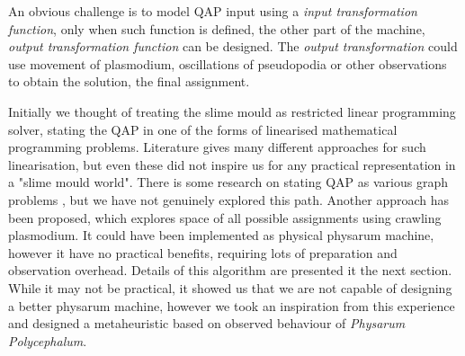 An obvious challenge is to model QAP input using a \textit{input transformation function}, only when such function is defined, the other part of the machine, \textit{output transformation function} can be designed. The \textit{output transformation} could use movement of plasmodium, oscillations of pseudopodia or other observations to obtain the solution, the final assignment.

Initially we thought of treating the slime mould as restricted linear programming solver, stating the QAP in one of the forms of linearised mathematical programming problems. Literature gives many different approaches for such linearisation, but even these did not inspire us for any practical representation in a "slime mould world". There is some research on stating QAP as various graph problems \cite{cela2013quadratic}, but we have not genuinely explored this path. Another approach has been proposed, which explores space of all possible assignments using crawling plasmodium. It could have been implemented as physical physarum machine, however it have no practical benefits, requiring lots of preparation and observation overhead. Details of this algorithm are presented it the next section. While it may not be practical, it showed us that we are not capable of designing a better physarum machine, however we took an inspiration from this experience and designed a metaheuristic based on observed behaviour of \textit{Physarum Polycephalum}.




